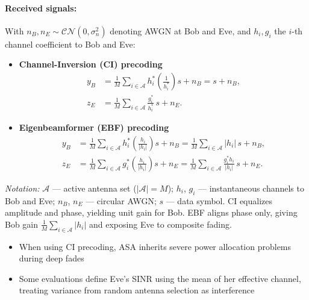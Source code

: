 \documentclass[10pt,a4paper]{article} %
\begin{document}
\paragraph{Received signals:}  
With $n_B,n_E\sim\mathcal{CN}(0,\sigma_n^2)$ denoting AWGN at Bob and Eve, and
$h_i,g_i$ the $i$-th channel coefficient to Bob and Eve:

\begin{itemize}[leftmargin=1.5em]
\item \textbf{Channel-Inversion (CI) precoding}
  \begin{align}
    y_B &= \frac{1}{M}\!\sum_{i\in\mathcal{A}}\!h_i^*\!\left(\frac{1}{h_i^*}\right)s + n_B 
         = s + n_B, \\[2pt]
    z_E &= \frac{1}{M}\!\sum_{i\in\mathcal{A}}\!\frac{g_i^*}{h_i^*}\,s + n_E .
  \end{align}

\item \textbf{Eigenbeamformer (EBF) precoding}
  \begin{align}
    y_B &= \frac{1}{M}\!\sum_{i\in\mathcal{A}}\!h_i^*\!\left(\frac{h_i}{|h_i|}\right)s + n_B 
         = \frac{1}{M}\!\sum_{i\in\mathcal{A}}\!|h_i|\,s + n_B, \\[2pt]
    z_E &= \frac{1}{M}\!\sum_{i\in\mathcal{A}}\!g_i^*\!\left(\frac{h_i}{|h_i|}\right)s + n_E
         = \frac{1}{M}\!\sum_{i\in\mathcal{A}}\!\frac{g_i^* h_i}{|h_i|}\,s + n_E .
  \end{align}
\end{itemize}

\textit{Notation:} $\mathcal{A}$ — active antenna set ($|\mathcal{A}|=M$);  
$h_i$, $g_i$ — instantaneous channels to Bob and Eve;  
$n_B$, $n_E$ — circular AWGN; $s$ — data symbol.  
CI equalizes amplitude and phase, yielding unit gain for Bob.  
EBF aligns phase only, giving Bob gain $\tfrac{1}{M}\sum_{i\in\mathcal{A}}|h_i|$ and exposing Eve to composite fading.


\begin{itemize}[leftmargin=1.5em] %
    \item When using CI precoding, ASA inherits severe power allocation problems during deep fades
    \item Some evaluations define Eve's SINR using the mean of her effective channel, treating variance from random antenna selection as interference
\end{itemize}
\end{document}
